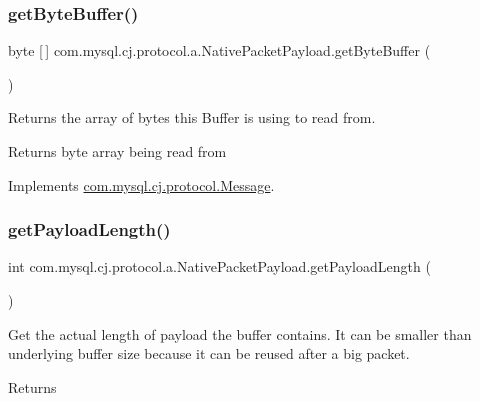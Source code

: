 \subsubsection{\texorpdfstring{get\+Byte\+Buffer()}{getByteBuffer()}}
{\footnotesize\ttfamily byte \mbox{[}$\,$\mbox{]} com.\+mysql.\+cj.\+protocol.\+a.\+Native\+Packet\+Payload.\+get\+Byte\+Buffer (\begin{DoxyParamCaption}{ }\end{DoxyParamCaption})}

Returns the array of bytes this Buffer is using to read from.

\begin{DoxyReturn}{Returns}
byte array being read from 
\end{DoxyReturn}


Implements \mbox{\hyperlink{interfacecom_1_1mysql_1_1cj_1_1protocol_1_1_message_a853af9bf4f09a55058141c7b041a8815}{com.\+mysql.\+cj.\+protocol.\+Message}}.

\mbox{\label{classcom_1_1mysql_1_1cj_1_1protocol_1_1a_1_1_native_packet_payload_aabf5bb67ce83f25d25373f902c403754}} 
\subsubsection{\texorpdfstring{get\+Payload\+Length()}{getPayloadLength()}}
{\footnotesize\ttfamily int com.\+mysql.\+cj.\+protocol.\+a.\+Native\+Packet\+Payload.\+get\+Payload\+Length (\begin{DoxyParamCaption}{ }\end{DoxyParamCaption})}

Get the actual length of payload the buffer contains. It can be smaller than underlying buffer size because it can be reused after a big packet.

\begin{DoxyReturn}{Returns}

\end{DoxyReturn}
\mbox{\label{classcom_1_1mysql_1_1cj_1_1protocol_1_1a_1_1_native_packet_payload_a89ff1dc3fa0998b1362a9fc2351d6797}} 
